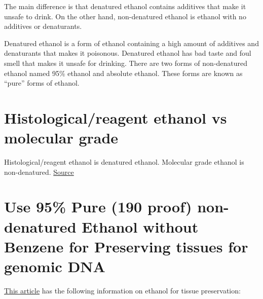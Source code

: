 \documentclass[
  letterpaper,
  DIV=11,
  numbers=noendperiod]{scrreprt}
\begin{document}

The main difference is that denatured ethanol contains additives that
make it unsafe to drink. On the other hand, non-denatured ethanol is
ethanol with no additives or denaturants.

Denatured ethanol is a form of ethanol containing a high amount of
additives and denaturants that makes it poisonous. Denatured ethanol has
bad taste and foul smell that makes it unsafe for drinking. There are
two forms of non-denatured ethanol named 95\% ethanol and absolute
ethanol. These forms are known as ``pure'' forms of ethanol.

\hypertarget{histologicalreagent-ethanol-vs-molecular-grade}{%
\section*{\texorpdfstring{\textbf{Histological/reagent ethanol vs
molecular
grade}}{Histological/reagent ethanol vs molecular grade}}\label{histologicalreagent-ethanol-vs-molecular-grade}}


Histological/reagent ethanol is denatured ethanol. Molecular grade
ethanol is non-denatured.
\href{https://www.differencebetween.com/difference-between-denatured-and-vs-undenatured-ethanol/\#Undenatured\%20Ethanol}{Source}

\hypertarget{use-95-pure-190-proof-non-denatured-ethanol-without-benzene-for-preserving-tissues-for-genomic-dna}{%
\section*{\texorpdfstring{\textbf{Use 95\% Pure (190 proof)
non-denatured Ethanol without Benzene for Preserving tissues for genomic
DNA}}{Use 95\% Pure (190 proof) non-denatured Ethanol without Benzene for Preserving tissues for genomic DNA}}\label{use-95-pure-190-proof-non-denatured-ethanol-without-benzene-for-preserving-tissues-for-genomic-dna}}


\href{https://link.springer.com/article/10.1007/s13127-010-0012-4}{This
article} has the following information on ethanol for tissue
preservation:
\end{document}
